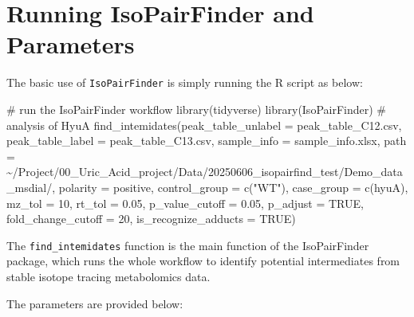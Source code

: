 \documentclass[
  letterpaper,
  DIV=11,
  numbers=noendperiod]{scrreprt}
\newenvironment{Shaded}{\begin{snugshade}}{\end{snugshade}}
\newcommand{\AttributeTok}[1]{\textcolor[rgb]{0.40,0.45,0.13}{#1}}
\newcommand{\CommentTok}[1]{\textcolor[rgb]{0.37,0.37,0.37}{#1}}
\newcommand{\ConstantTok}[1]{\textcolor[rgb]{0.56,0.35,0.01}{#1}}
\newcommand{\DecValTok}[1]{\textcolor[rgb]{0.68,0.00,0.00}{#1}}
\newcommand{\FloatTok}[1]{\textcolor[rgb]{0.68,0.00,0.00}{#1}}
\newcommand{\FunctionTok}[1]{\textcolor[rgb]{0.28,0.35,0.67}{#1}}
\newcommand{\NormalTok}[1]{\textcolor[rgb]{0.00,0.23,0.31}{#1}}
\newcommand{\StringTok}[1]{\textcolor[rgb]{0.13,0.47,0.30}{#1}}
\begin{document}
\section{Running IsoPairFinder and
Parameters}\label{sec-isoPairFinder-parameters}

The basic use of \texttt{IsoPairFinder} is simply running the R script
as below:

\begin{Shaded}
\begin{Highlighting}[]
\CommentTok{\# run the IsoPairFinder workflow}
\FunctionTok{library}\NormalTok{(tidyverse)}
\FunctionTok{library}\NormalTok{(IsoPairFinder)}
\CommentTok{\# analysis of HyuA}
\FunctionTok{find\_intemidates}\NormalTok{(}\AttributeTok{peak\_table\_unlabel =} \StringTok{\textquotesingle{}peak\_table\_C12.csv\textquotesingle{}}\NormalTok{,}
                 \AttributeTok{peak\_table\_label =} \StringTok{\textquotesingle{}peak\_table\_C13.csv\textquotesingle{}}\NormalTok{,}
                 \AttributeTok{sample\_info =} \StringTok{\textquotesingle{}sample\_info.xlsx\textquotesingle{}}\NormalTok{,}
                 \AttributeTok{path =} \StringTok{\textquotesingle{}\textasciitilde{}/Project/00\_Uric\_Acid\_project/Data/20250606\_isopairfind\_test/Demo\_data\_msdial/\textquotesingle{}}\NormalTok{,}
                 \AttributeTok{polarity =} \StringTok{\textquotesingle{}positive\textquotesingle{}}\NormalTok{,}
                 \AttributeTok{control\_group =} \FunctionTok{c}\NormalTok{(}\StringTok{"WT"}\NormalTok{),}
                 \AttributeTok{case\_group =} \FunctionTok{c}\NormalTok{(}\StringTok{\textquotesingle{}hyuA\textquotesingle{}}\NormalTok{),}
                 \AttributeTok{mz\_tol =} \DecValTok{10}\NormalTok{,}
                 \AttributeTok{rt\_tol =} \FloatTok{0.05}\NormalTok{,}
                 \AttributeTok{p\_value\_cutoff =} \FloatTok{0.05}\NormalTok{,}
                 \AttributeTok{p\_adjust =} \ConstantTok{TRUE}\NormalTok{,}
                 \AttributeTok{fold\_change\_cutoff =} \DecValTok{20}\NormalTok{,}
                 \AttributeTok{is\_recognize\_adducts =} \ConstantTok{TRUE}\NormalTok{)}
\end{Highlighting}
\end{Shaded}

The \texttt{find\_intemidates} function is the main function of the
IsoPairFinder package, which runs the whole workflow to identify
potential intermediates from stable isotope tracing metabolomics data.

The parameters are provided below:
\end{document}
